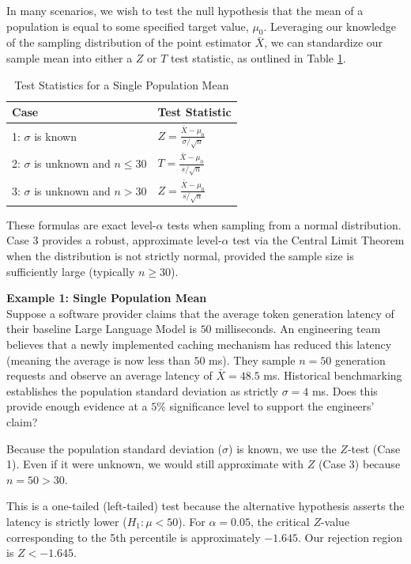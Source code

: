 \documentclass{article}
\begin{document}
In many scenarios, we wish to test the null hypothesis that the mean of a population is equal to some specified target value, $\mu_0$. Leveraging our knowledge of the sampling distribution of the point estimator $\bar{X}$, we can standardize our sample mean into either a $Z$ or $T$ test statistic, as outlined in Table \ref{tab:meantests1}.

\begin{table}[h]
\centering
\bgroup
\def\arraystretch{2.0}
\begin{tabular}{ll}
\hline
\textbf{Case} & \textbf{Test Statistic} \\ \hline
1: $\sigma$ is known & $Z = \frac{\bar{X} - \mu_0}{\sigma / \sqrt{n}}$ \\
2: $\sigma$ is unknown and $n \leq 30$ & $T = \frac{\bar{X} - \mu_0}{s / \sqrt{n}}$ \\
3: $\sigma$ is unknown and $n > 30$ & $Z = \frac{\bar{X} - \mu_0}{s / \sqrt{n}}$ \\ \hline \hline
\end{tabular}
\egroup
\caption{\label{tab:meantests1} Test Statistics for a Single Population Mean}
\end{table}

These formulas are exact level-$\alpha$ tests when sampling from a normal distribution. Case 3 provides a robust, approximate level-$\alpha$ test via the Central Limit Theorem when the distribution is not strictly normal, provided the sample size is sufficiently large (typically $n \geq 30$).

\textbf{Example 1: Single Population Mean} \\
Suppose a software provider claims that the average token generation latency of their baseline Large Language Model is $50$ milliseconds. An engineering team believes that a newly implemented caching mechanism has reduced this latency (meaning the average is now less than $50$ ms). They sample $n=50$ generation requests and observe an average latency of $\bar{X} = 48.5$ ms. Historical benchmarking establishes the population standard deviation as strictly $\sigma = 4$ ms. Does this provide enough evidence at a $5\%$ significance level to support the engineers' claim?

Because the population standard deviation ($\sigma$) is known, we use the $Z$-test (Case 1). Even if it were unknown, we would still approximate with $Z$ (Case 3) because $n=50 > 30$.

This is a one-tailed (left-tailed) test because the alternative hypothesis asserts the latency is strictly lower ($H_1: \mu < 50$). For $\alpha=0.05$, the critical $Z$-value corresponding to the 5th percentile is approximately $-1.645$. Our rejection region is $Z < -1.645$.
\end{document}
